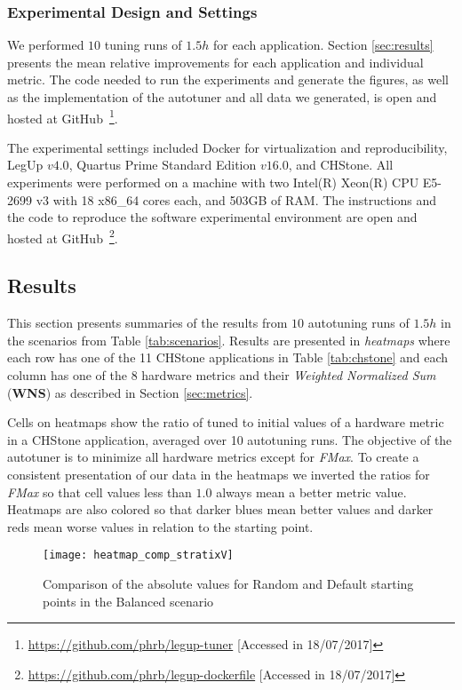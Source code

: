 \subsubsection{Experimental Design and Settings}

We performed $10$ tuning runs of $1.5h$ for each application.  Section
\ref{sec:results} presents the mean relative improvements for each application
and individual metric. The code needed to run the experiments and generate the
figures, as well as the implementation of the autotuner and all data we
generated, is open and hosted at
GitHub~\footnote{\url{https://github.com/phrb/legup-tuner} [Accessed in
18/07/2017]}.

The experimental settings included Docker for virtualization and
reproducibility, LegUp $v4.0$, Quartus Prime Standard Edition $v16.0$, and
CHStone. All experiments were performed on a machine with two Intel(R) Xeon(R)
CPU E5-2699 v3 with 18 x86\_64 cores each, and 503GB of RAM.  The instructions
and the code to reproduce the software experimental environment are open and
hosted at GitHub~\footnote{\url{https://github.com/phrb/legup-dockerfile}
[Accessed in 18/07/2017]}.

\subsection{Results}
\label{sec:FPGAres}

This section presents summaries of the results from $10$ autotuning runs of
$1.5h$ in the scenarios from Table \ref{tab:scenarios}.  Results are presented
in \textit{heatmaps} where each row has one of the 11 CHStone applications in
Table \ref{tab:chstone} and each column has one of the 8 hardware metrics and
their \textit{Weighted Normalized Sum} (\textbf{WNS}) as described in Section
\ref{sec:metrics}.

Cells on heatmaps show the ratio of tuned to initial values of a hardware
metric in a CHStone application, averaged over 10 autotuning runs. The
objective of the autotuner is to minimize all hardware metrics except for
\textit{FMax}.  To create a consistent presentation of our data in the heatmaps
we inverted the ratios for \textit{FMax} so that cell values less than $1.0$
always mean a better metric value.  Heatmaps are also colored so that darker
blues mean better values and darker reds mean worse values in relation to the
starting point.

\begin{figure}[htpb]
    \centering
    \texttt{[image: heatmap\_comp\_stratixV]}
    \caption{Comparison of the absolute values for Random and Default starting points in the Balanced scenario}
    \label{fig:comp}
\end{figure}

